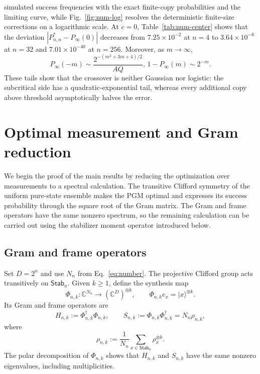 \documentclass[journal,twocolumn]{IEEEtran}
\theoremstyle{definition}
\theoremstyle{plain}
\newcommand{\Stab}{\mathsf{Stab}}
\begin{document}
simulated success frequencies with the exact finite-copy probabilities
and the limiting curve, while Fig.~\ref{fig:num-log} resolves the
deterministic finite-size corrections on a logarithmic scale.
At $c=0$, Table~\ref{tab:num-center} shows that the deviation
$|P^*_{n,n}-P_\infty(0)|$ decreases from $7.25\times10^{-2}$ at $n=4$
to $3.64\times10^{-6}$ at $n=32$ and $7.01\times10^{-40}$ at $n=256$.
Moreover, as $m\to\infty$,
\begin{equation}
 P_\infty(-m)\sim \frac{2^{-(m^2+3m+4)/2}}{AQ},\,
 1-P_\infty(m)\sim2^{-m}.
\end{equation}
These tails show that the crossover is neither Gaussian nor logistic: the subcritical
side has a quadratic-exponential tail, whereas every additional copy above
threshold asymptotically halves the error.

\section{Optimal measurement and Gram reduction}
\label{sec:measurement}
We begin the proof of the main results by reducing the optimization over
measurements to a spectral calculation.  The transitive Clifford symmetry
of the uniform pure-state ensemble makes the PGM optimal and expresses
its success probability through the square root of the Gram matrix.
The Gram and frame operators have the same nonzero spectrum, so the
remaining calculation can be carried out using the stabilizer moment
operator introduced below.

\subsection{Gram and frame operators}
Set $D=2^n$ and use $N_n$ from Eq.~\eqref{eq:number}.
The projective
Clifford group acts transitively on $\Stab_n$.  Given $k\geq1$, define the
synthesis map
\begin{equation}
 \Phi_{n,k}:\mathbb C^{N_n}\longrightarrow
 (\mathbb C^D)^{\otimes k},
 \qquad
 \Phi_{n,k}e_x=|x\rangle^{\otimes k}.
 \label{eqS:analysis}
\end{equation}
Its Gram and frame operators are
\begin{equation}
 H_{n,k}:=\Phi_{n,k}^{\dagger}\Phi_{n,k},
 \qquad
 S_{n,k}:=\Phi_{n,k}\Phi_{n,k}^{\dagger}
          =N_n\rho_{n,k},
 \label{eqS:gram-frame}
\end{equation}
where
\begin{equation}
 \rho_{n,k}:=\frac1{N_n}\sum_{x\in\Stab_n}\rho_x^{\otimes k}.
 \label{eqS:moment}
\end{equation}
The polar decomposition of $\Phi_{n,k}$ shows that $H_{n,k}$ and
$S_{n,k}$ have the same nonzero eigenvalues, including multiplicities.
\end{document}
